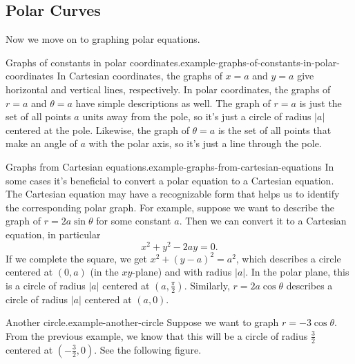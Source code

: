 \documentclass[10pt,]{book}
\numberwithin{equation}{section}
\begin{document}
\subsection[{Polar Curves}]{Polar Curves}\label{subsection-polar-curves}
\hypertarget{p-1027}{}%
Now we move on to graphing polar equations.%
\begin{example}{Graphs of constants in polar coordinates.}{example-graphs-of-constants-in-polar-coordinates}%
\hypertarget{p-1028}{}%
In Cartesian coordinates, the graphs of \(x=a\) and \(y=a\) give horizontal and vertical lines, respectively. In polar coordinates, the graphs of \(r=a\) and \(\theta=a\) have simple descriptions as well. The graph of \(r=a\) is just the set of all points \(a\) units away from the pole, so it's just a circle of radius \(|a|\) centered at the pole. Likewise, the graph of \(\theta = a\) is the set of all points that make an angle of \(a\) with the polar axis, so it's just a line through the pole.%
\end{example}
\begin{example}{Graphs from Cartesian equations.}{example-graphs-from-cartesian-equations}%
\hypertarget{p-1029}{}%
In some cases it's beneficial to convert a polar equation to a Cartesian equation. The Cartesian equation may have a recognizable form that helps us to identify the corresponding polar graph. For example, suppose we want to describe the graph of \(r = 2a\sin\theta\) for some constant \(a\). Then we can convert it to a Cartesian equation, in particular%
%
\begin{equation*}
x^{2}+y^{2} - 2ay = 0.
\end{equation*}
\hypertarget{p-1030}{}%
If we complete the square, we get \(x^{2}+(y-a)^{2} = a^{2}\), which describes a circle centered at \((0,a)\) (in the \(xy\)-plane) and with radius \(|a|\). In the polar plane, this is a circle of radius \(|a|\) centered at \((a,\frac{\pi}{2}).\) Similarly, \(r=2a\cos\theta\) describes a circle of radius \(|a|\) centered at \((a,0)\).%
\end{example}
\begin{example}{Another circle.}{example-another-circle}%
\hypertarget{p-1031}{}%
Suppose we want to graph \(r=-3\cos\theta\). From the previous example, we know that this will be a circle of radius \(\frac{3}{2}\) centered at \((-\frac{3}{2},0)\). See the following figure.%
\end{example}
\end{document}
